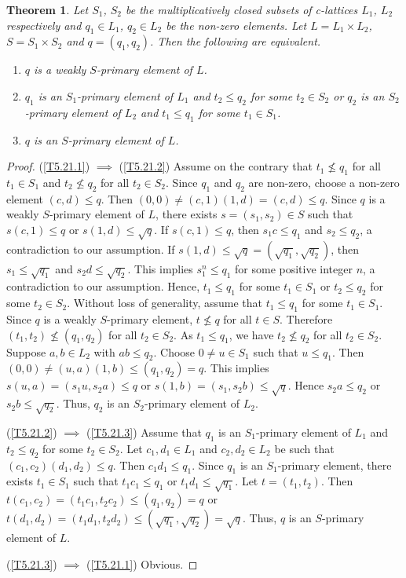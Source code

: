 \documentclass[10pt,twoside,a4paper]{amsart}
\numberwithin{equation}{section}
\theoremstyle{plain}
\newtheorem{thm}[lem]{Theorem}
\theoremstyle{definition}
\begin{document}
\begin{thm}%
	Let $S_1$, $S_2$ be the multiplicatively closed subsets of c-lattices $L_1$, $L_2$ respectively and $q_1\in L_1$, $q_2\in L_2$ be the non-zero elements. Let $L=L_1\times L_2$, $S=S_1\times S_2$ and $q=(q_1,q_2)$. Then the following are equivalent.
	\begin{enumerate}
		\item\label{T5.21.1} $q$ is a weakly $S$-primary element of $L$.
		\item\label{T5.21.2} $q_1$ is an $S_1$-primary element of $L_1$ and $t_2\leq q_2$ for some $t_2\in S_2$ or $q_2$ is an $S_2$-primary element of $L_2$ and $t_1\leq q_1$ for some $t_1\in S_1$.
		\item\label{T5.21.3} $q$ is an $S$-primary element of $L$.
	\end{enumerate}
\end{thm}
\begin{proof}
	(\ref{T5.21.1}) $\implies$ (\ref{T5.21.2}) Assume on the contrary that $t_1\nleq q_1$ for all $t_1\in S_1$ and $t_2\nleq q_2$ for all $t_2\in S_2$. Since $q_1$ and $q_2$ are non-zero, choose a non-zero element $(c,d)\leq q$. Then $(0,0)\neq (c,1)(1,d)=(c,d)\leq q$. Since $q$ is a weakly $S$-primary element of $L$, there exists $s=(s_1,s_2)\in S$ such that $s(c,1)\leq q$ or $s(1,d)\leq \sqrt{q}$. If $s(c,1)\leq q$, then $s_1c\leq q_1$ and $s_2\leq q_2$, a contradiction to our assumption. If $s(1,d)\leq \sqrt{q}=(\sqrt{q_1},\sqrt{q_2})$, then $s_1\leq \sqrt{q_1}$ and $s_2d \leq \sqrt{q_2}$. This implies $s_1^n\leq q_1$ for some positive integer $n$, a contradiction to our assumption. Hence, $t_1\leq q_1$ for some $t_1\in S_1$ or $t_2\leq q_2$ for some $t_2\in S_2$. Without loss of generality, assume that $t_1\leq q_1$ for some $t_1\in S_1$. Since $q$ is a weakly $S$-primary element, $t\nleq q$ for all $t\in S$. Therefore $(t_1,t_2)\nleq (q_1,q_2)$ for all $t_2\in S_2$. As $t_1\leq q_1$, we have $t_2\nleq q_2$ for all $t_2\in S_2$. Suppose $a,b \in L_2$ with $ab \leq q_2$. Choose $0\neq u\in S_1$ such that $u\leq q_1$. Then $(0,0)\neq (u,a)(1,b)\leq (q_1,q_2)=q$. This implies $s(u,a)=(s_1u,s_2a)\leq q$ or $s(1,b)=(s_1,s_2b)\leq \sqrt{q}$. Hence $s_2a\leq q_2$ or $s_2b \leq \sqrt{q_2}$. Thus, $q_2$ is an $S_2$-primary element of $L_2$.
	
	(\ref{T5.21.2}) $\implies$ (\ref{T5.21.3}) Assume that $q_1$ is an $S_1$-primary element of $L_1$ and $t_2\leq q_2$ for some $t_2\in S_2$. Let $c_1,d_1\in L_1$ and $c_2,d_2\in L_2$ be such that $(c_1,c_2)(d_1,d_2)\leq q$. Then $c_1d_1\leq q_1$. Since $q_1$ is an  $S_1$-primary element, there exists $t_1\in S_1$ such that $t_1c_1\leq q_1$ or $t_1d_1\leq \sqrt{q_1}$. Let $t=(t_1,t_2)$. Then $t(c_1,c_2)=(t_1c_1,t_2c_2)\leq (q_1,q_2)=q$ or $t(d_1,d_2)=(t_1d_1,t_2d_2)\leq (\sqrt{q_1},\sqrt{q_2})=\sqrt{q}$. Thus, $q$ is an $S$-primary element of $L$.
	
	(\ref{T5.21.3}) $\implies$ (\ref{T5.21.1}) Obvious.
\end{proof}
\end{document}
